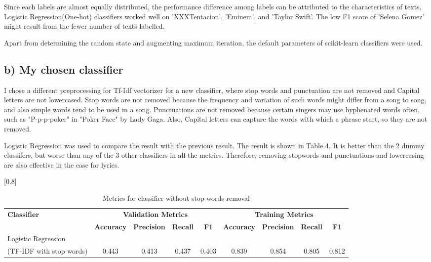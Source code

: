 \documentclass[a4paper,11pt]{article}
\begin{document}
Since each labels are almost equally distributed, the performance difference among labels can be attributed to the characteristics of texts.
Logistic Regression(One-hot) classifiers worked well on 'XXXTentacion', 'Eminem', and 'Taylor Swift'.
The low F1 score of 'Selena Gomez' might result from the fewer number of texts labelled.

Apart from determining the random state and augmenting maximum iteration, the default parameters of scikit-learn classifiers were used.


\subsection{b) My chosen classifier}
I chose a different preprocessing for Tf-Idf vectorizer for a new classifier, where stop words and punctuation are not removed and Capital letters are not lowercased.
Stop words are not removed because the frequency and variation of such words might differ from a song to song, and also simple words tend to be used in a song.
Punctuations are not removed because certain singers may use hyphenated words often, such as "P-p-p-poker" in "Poker Face" by Lady Gaga. 
Also, Capital letters can capture the words with which a phrase start, so they are not removed.

Logistic Regression was used to compare the result with the previous result.
The result is shown in Table 4.
It is better than the 2 dummy clussifers, but worse than any of the 3 other classifiers in all the metrics.
Therefore, removing stopwords and punctuations and lowercasing are also effective in the case for lyrics.


\begin{table}[htbp]
    \centering
    \caption{Metrics for classifier without stop-words removal}
    \small
    \scalebox{0.8}[0.8]{
    \begin{tabular}{l|cccc|cccc}
        \hline
        \textbf{Classifier} & \multicolumn{4}{c|}{\textbf{Validation Metrics}} & \multicolumn{4}{c}{\textbf{Training Metrics}} \\
        & \textbf{Accuracy} & \textbf{Precision} & \textbf{Recall} & \textbf{F1} & \textbf{Accuracy} & \textbf{Precision} & \textbf{Recall} & \textbf{F1} \\
        \hline 
        Logistic Regression &&&&&& \\ (TF-IDF with stop words) & 0.443 & 0.413 & 0.437 & 0.403 & 0.839 & 0.854 & 0.805 & 0.812 \\
        \hline
    \end{tabular}
    }
\end{table}
\end{document}
